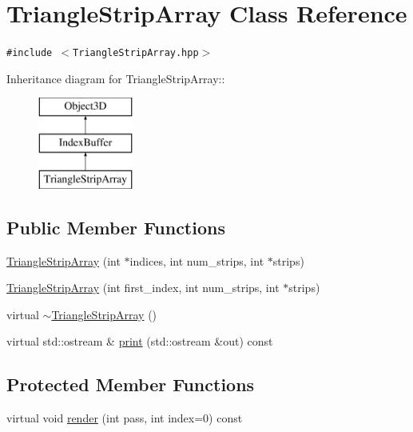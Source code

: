 \hypertarget{classm3g_1_1TriangleStripArray}{
\section{TriangleStripArray Class Reference}
\label{classm3g_1_1TriangleStripArray}
}
{\tt \#include $<$TriangleStripArray.hpp$>$}

Inheritance diagram for TriangleStripArray::\begin{figure}[H]
\begin{center}
\leavevmode
\includegraphics[height=3cm]{classm3g_1_1TriangleStripArray}
\end{center}
\end{figure}
\subsection*{Public Member Functions}
\begin{CompactItemize}
\item 
\hyperlink{classm3g_1_1TriangleStripArray_57d4e874819367084aeadb11593c4436}{TriangleStripArray} (int $\ast$indices, int num\_\-strips, int $\ast$strips)
\item 
\hyperlink{classm3g_1_1TriangleStripArray_d2ca9884a6ccf32da3cee977549b5ee0}{TriangleStripArray} (int first\_\-index, int num\_\-strips, int $\ast$strips)
\item 
virtual \hyperlink{classm3g_1_1TriangleStripArray_1cb3853bf79b7710d57044da818d2cde}{$\sim$TriangleStripArray} ()
\item 
virtual std::ostream \& \hyperlink{classm3g_1_1TriangleStripArray_6fea17fa1532df3794f8cb39cb4f911f}{print} (std::ostream \&out) const 
\end{CompactItemize}
\subsection*{Protected Member Functions}
\begin{CompactItemize}
\item 
virtual void \hyperlink{classm3g_1_1TriangleStripArray_1efcb1973989d9963d5bd6d03065d389}{render} (int pass, int index=0) const 
\end{CompactItemize}
